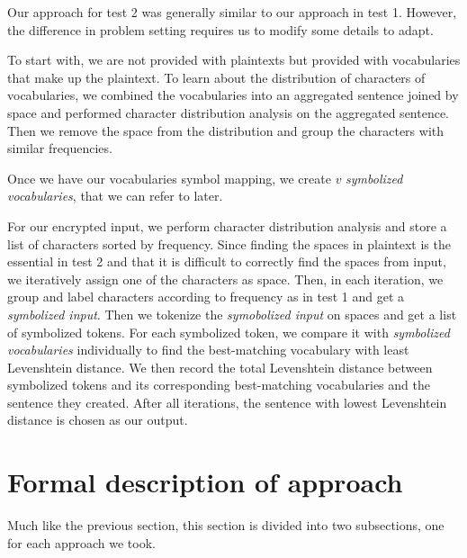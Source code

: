 \documentclass[12pt]{article}
\begin{document}
Our approach for test 2 was generally similar to our approach in test 1. However, the difference in problem setting requires us to modify some details to adapt.

To start with, we are not provided with plaintexts but provided with vocabularies that make up the plaintext. To learn about the distribution of characters of vocabularies, we combined the vocabularies into an aggregated sentence joined by space and performed character distribution analysis on the aggregated sentence. Then we remove the space from the distribution and group the characters with similar frequencies. 

Once we have our vocabularies symbol mapping, we create $v$ \emph{symbolized vocabularies}, that we can refer to later.

For our encrypted input, we perform character distribution analysis and store a list of characters sorted by frequency. Since finding the spaces in plaintext is the essential in test 2 and that it is difficult to correctly find the spaces from input, we iteratively assign one of the characters as space. Then, in each iteration, we group and label characters according to frequency as in test 1 and get a \emph{symbolized input}. Then we tokenize the \emph{symobolized input} on spaces and get a list of symbolized tokens. For each symbolized token, we compare it with \emph{symbolized vocabularies} individually to find the best-matching vocabulary with least Levenshtein distance. We then record the total Levenshtein distance between symbolized tokens and its corresponding best-matching vocabularies and the sentence they created. After all iterations, the sentence with lowest Levenshtein distance is chosen as our output.


\section{Formal description of approach}
Much like the previous section, this section is divided into two subsections, one for each approach we took.
\end{document}
